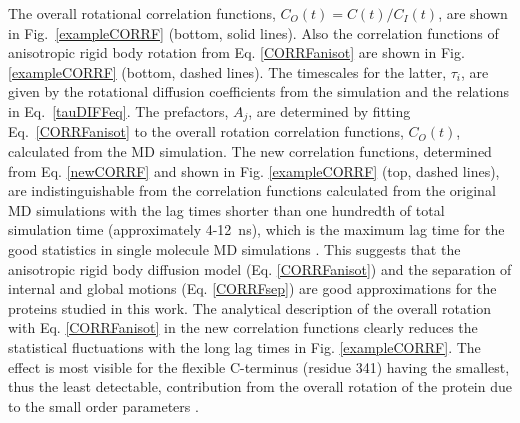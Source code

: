 \documentclass[journal=jpcbfk,manuscript=article]{achemso}
\begin{document}
The overall rotational correlation functions, $C_O(t)=C(t)/C_I(t)$,
are shown in Fig.~\ref{exampleCORRF} (bottom, solid lines).
Also the correlation functions of anisotropic rigid body rotation
from Eq. \ref{CORRFanisot} are shown in Fig. \ref{exampleCORRF} (bottom, dashed lines).
The timescales for the latter, $\tau_i$, are given by the rotational
diffusion coefficients from the simulation and the relations
in Eq.~\ref{tauDIFFeq}. The prefactors, $A_j$, are determined by fitting
Eq.~\ref{CORRFanisot} to the overall rotation correlation functions, $C_O(t)$, calculated from the MD simulation.
The new correlation functions, determined from Eq. \ref{newCORRF} and
shown in Fig. \ref{exampleCORRF} (top, dashed lines),
are indistinguishable from the correlation functions calculated from
the original MD simulations with the lag times shorter than one
hundredth of total simulation time (approximately 4-12~ns),
which is the maximum lag time for the good statistics in single molecule MD simulations \cite{lu06}.
This suggests that the anisotropic rigid body diffusion model (Eq. \ref{CORRFanisot}) and
the separation of internal and global motions (Eq. \ref{CORRFsep}) are
good approximations for the proteins studied in this work.
The analytical description of the overall rotation with Eq. \ref{CORRFanisot}
in the new correlation functions
clearly reduces the statistical fluctuations with the long lag times in Fig. \ref{exampleCORRF}.
The effect is most visible for the flexible C-terminus (residue 341) having
the smallest, thus the least detectable, contribution from the
overall rotation of the protein due to the small order parameters .
\end{document}
